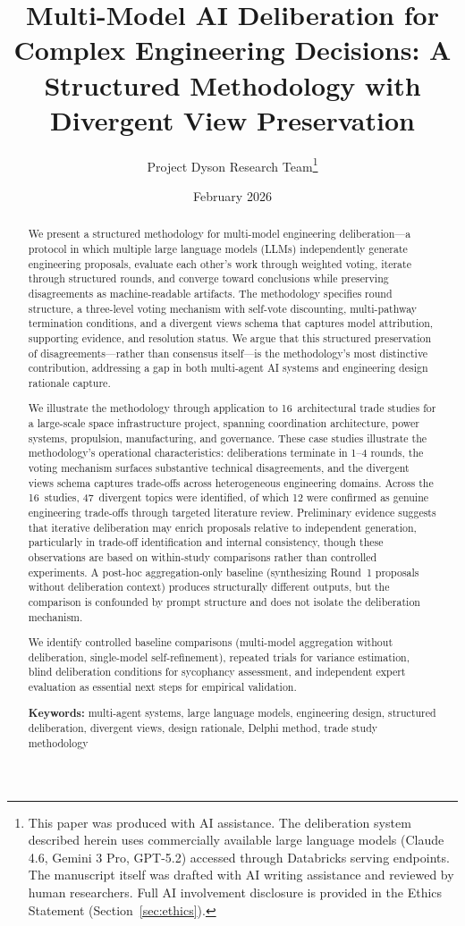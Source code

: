 \documentclass[11pt,a4paper]{article}
\title{\textbf{Multi-Model AI Deliberation for Complex Engineering Decisions: A Structured Methodology with Divergent View Preservation}}
\author{Project Dyson Research Team\thanks{This paper was produced with AI assistance. The deliberation system described herein uses commercially available large language models (Claude 4.6, Gemini 3 Pro, GPT-5.2) accessed through Databricks serving endpoints. The manuscript itself was drafted with AI writing assistance and reviewed by human researchers. Full AI involvement disclosure is provided in the Ethics Statement (Section~\ref{sec:ethics}).}}
\affil{Project Dyson --- Open-Source Space Infrastructure Initiative\\ \texttt{https://projectdyson.org}}
\date{February 2026}
\begin{document}
\maketitle

\begin{abstract}
We present a structured methodology for multi-model engineering deliberation---a protocol in which multiple large language models (LLMs) independently generate engineering proposals, evaluate each other's work through weighted voting, iterate through structured rounds, and converge toward conclusions while preserving disagreements as machine-readable artifacts. The methodology specifies round structure, a three-level voting mechanism with self-vote discounting, multi-pathway termination conditions, and a divergent views schema that captures model attribution, supporting evidence, and resolution status. We argue that this structured preservation of disagreements---rather than consensus itself---is the methodology's most distinctive contribution, addressing a gap in both multi-agent AI systems and engineering design rationale capture.

We illustrate the methodology through application to 16~architectural trade studies for a large-scale space infrastructure project, spanning coordination architecture, power systems, propulsion, manufacturing, and governance. These case studies illustrate the methodology's operational characteristics: deliberations terminate in 1--4 rounds, the voting mechanism surfaces substantive technical disagreements, and the divergent views schema captures trade-offs across heterogeneous engineering domains. Across the 16~studies, 47~divergent topics were identified, of which 12 were confirmed as genuine engineering trade-offs through targeted literature review. Preliminary evidence suggests that iterative deliberation may enrich proposals relative to independent generation, particularly in trade-off identification and internal consistency, though these observations are based on within-study comparisons rather than controlled experiments. A post-hoc aggregation-only baseline (synthesizing Round~1 proposals without deliberation context) produces structurally different outputs, but the comparison is confounded by prompt structure and does not isolate the deliberation mechanism.

We identify controlled baseline comparisons (multi-model aggregation without deliberation, single-model self-refinement), repeated trials for variance estimation, blind deliberation conditions for sycophancy assessment, and independent expert evaluation as essential next steps for empirical validation.

\medskip
\noindent\textbf{Keywords:} multi-agent systems, large language models, engineering design, structured deliberation, divergent views, design rationale, Delphi method, trade study methodology
\end{abstract}
\end{document}

